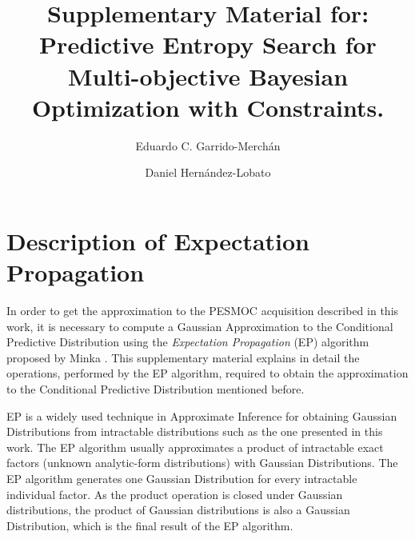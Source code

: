\documentclass[review,preprint,12pt]{elsarticle}
\begin{document}
\begin{frontmatter}

\title{Supplementary Material for: Predictive Entropy Search for Multi-objective Bayesian Optimization with Constraints. }

\author{Eduardo C. Garrido-Merch\'an}
\address{Computer Science Department\\
       Universidad Aut\'onoma de Madrid\\
       Francisco Tom\'as y Valiente 11, Madrid, Spain}
\author{Daniel Hern\'andez-Lobato}
\address{Computer Science Department\\
       Universidad Aut\'onoma de Madrid\\
       Francisco Tom\'as y Valiente 11, Madrid, Spain}

\maketitle

\end{frontmatter}

\section{Description of Expectation Propagation}

In order to get the approximation to the PESMOC acquisition described in this work, it is necessary to compute a Gaussian Approximation to the Conditional Predictive Distribution using the \textit{Expectation Propagation} (EP) algorithm proposed by Minka \citep{minka2001expectation}. This supplementary material explains in detail the operations, performed by the EP algorithm, required to obtain the approximation to the Conditional Predictive Distribution mentioned before.

EP is a widely used technique in Approximate Inference for obtaining Gaussian Distributions from intractable distributions such as the one presented in this work. The EP algorithm usually approximates a product of intractable exact factors (unknown analytic-form distributions) with Gaussian Distributions. The EP algorithm generates one Gaussian Distribution for every intractable individual factor. As the product operation is closed under Gaussian distributions, the product of Gaussian distributions is also a Gaussian Distribution, which is the final result of the EP algorithm. 
\end{document}
